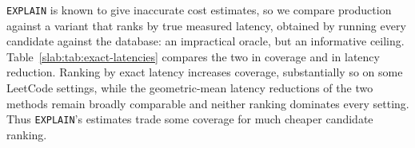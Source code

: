 \texttt{EXPLAIN} is known to give inaccurate cost estimates, so we
compare production \slabcity against a variant that ranks by true
measured latency, obtained by running every candidate against the
database: an impractical oracle, but an informative ceiling.
Table~\ref{slab:tab:exact-latencies} compares the two in coverage and
in latency reduction. Ranking by exact latency increases coverage,
substantially so on some LeetCode settings, while the geometric-mean
latency reductions of the two methods remain broadly comparable and
neither ranking dominates every setting. Thus \texttt{EXPLAIN}'s
estimates trade some coverage for much cheaper candidate ranking.

